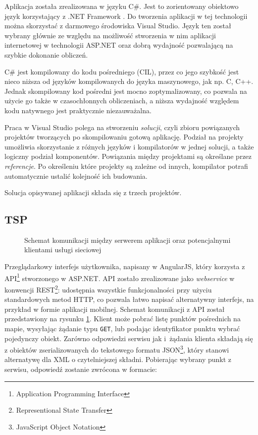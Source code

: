 Aplikacja została zrealizowana w języku C\#. Jest to zorientowany obiektowo język korzystający z .NET Framework \cite{csharp}. Do tworzenia aplikacji w tej technologii można skorzystać z darmowego środowiska Visual Studio. Język ten został wybrany głównie ze względu na możliwość stworzenia w nim aplikacji internetowej w technologii ASP.NET oraz dobrą wydajność pozwalającą na szybkie dokonanie obliczeń. 

C\# jest kompilowany do kodu pośredniego (CIL), przez co jego szybkość jest nieco niższa od języków kompilowanych do języka maszynowego, jak np. C, C++. Jednak skompilowany kod pośredni jest mocno zoptymalizowany, co pozwala na użycie go także w czasochłonnych obliczeniach, a niższa wydajność względem kodu natywnego jest praktycznie niezauważalna.

Praca w Visual Studio polega na stworzeniu \textit{solucji}, czyli zbioru powiązanych projektów tworzących po skompilowaniu gotową aplikację. Podział na projekty umożliwia skorzystanie z różnych języków i kompilatorów w jednej solucji, a także logiczny podział komponentów. Powiązania między projektami są określane przez \textit{referencje}. Po określeniu które projekty są zależne od innych, kompilator potrafi automatycznie ustalić kolejność ich budowania.

Solucja opisywanej aplikacji składa się z trzech projektów.

\subsection*{TSP} 

\begin{figure}
	\centering
	\def\svgwidth{\columnwidth}
	
	\caption{Schemat komunikacji między serwerem aplikacji oraz potencjalnymi klientami usługi sieciowej}
	\label{fig:rest_api}
\end{figure}

Przeglądarkowy interfejs użytkownika, napisany w AngularJS, który korzysta z API\footnote{Application Programming Interface} stworzonego w ASP.NET. API zostało zrealizowane jako \textit{webservice} w konwencji REST\footnote{Representional State Transfer}: udostępnia wszystkie funkcjonalności przy użyciu standardowych metod HTTP, co pozwala łatwo napisać alternatywny interfejs, na przykład w formie aplikacji mobilnej. Schemat komunikacji z API został przedstawiony na rysunku \ref{fig:rest_api}. Klient może pobrać listę punktów pośrednich na mapie, wysyłając żądanie typu \texttt{GET}, lub podając identyfikator punktu wybrać pojedynczy obiekt. Zarówno odpowiedzi serwisu jak i~żądania klienta składają się z obiektów zserializowanych do tekstowego formatu JSON\footnote{JavaScript Object Notation}, który stanowi alternatywę dla XML o czytelniejszej składni. Pobierając wybrany punkt z serwisu, odpowiedź zostanie zwrócona w formacie:

